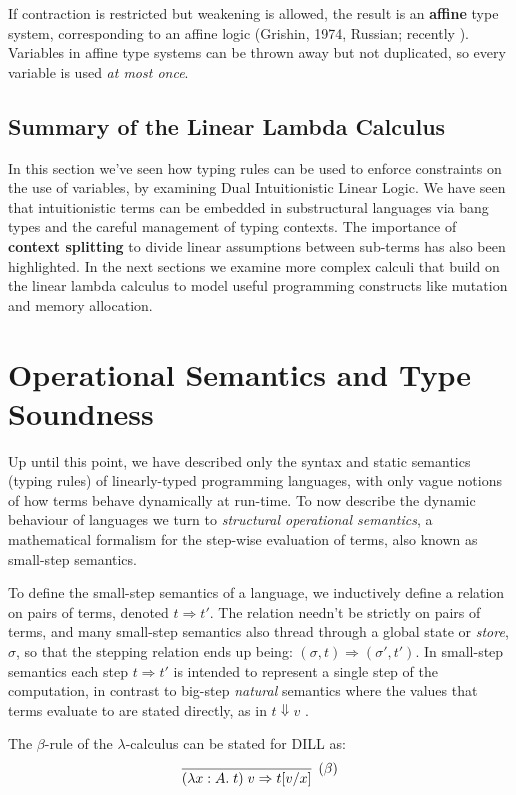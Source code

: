 \documentclass[]{unswthesis}
\newcommand{\steps}{\Rightarrow}
\let\i\textit
\let\b\textbf
\begin{document}
If contraction is restricted but weakening is allowed, the result is an \b{affine} type system, corresponding to an affine logic (Grishin, 1974, Russian; recently \cite{tov11}). Variables in affine type systems can be thrown away but not duplicated, so every variable is used \i{at most once}.

\subsection{Summary of the Linear Lambda Calculus}

In this section we've seen how typing rules can be used to enforce constraints on the use of variables, by examining Dual Intuitionistic Linear Logic. We have seen that intuitionistic terms can be embedded in substructural languages via bang types and the careful management of typing contexts. The importance of \b{context splitting} to divide linear assumptions between sub-terms has also been highlighted. In the next sections we examine more complex calculi that build on the linear lambda calculus to model useful programming constructs like mutation and memory allocation.

\section{Operational Semantics and Type Soundness}
\label{sec:op-sems-soundness}

Up until this point, we have described only the syntax and static semantics (typing rules) of linearly-typed programming languages, with only vague notions of how terms behave dynamically at run-time. To now describe the dynamic behaviour of languages we turn to \i{structural operational semantics}, a mathematical formalism for the step-wise evaluation of terms, also known as small-step semantics.

To define the small-step semantics of a language, we inductively define a relation on pairs of terms, denoted $t \steps t'$. The relation needn't be strictly on pairs of terms, and many small-step semantics also thread through a global state or \i{store}, $\sigma$, so that the stepping relation ends up being: $(\sigma, t) \steps (\sigma', t')$. In small-step semantics each step $t \steps t'$ is intended to represent a single step of the computation, in contrast to big-step \i{natural} semantics where the values that terms evaluate to are stated directly, as in $t \Downarrow v$ \cite{gunterSemantics}.

The $\beta$-rule of the $\lambda$-calculus can be stated for DILL as:
\begin{eqnarray*}
\infer[(\beta)]{(\lambda x : A. \; t) \; v \steps t[v/x]}{}
\end{eqnarray*}
\end{document}
